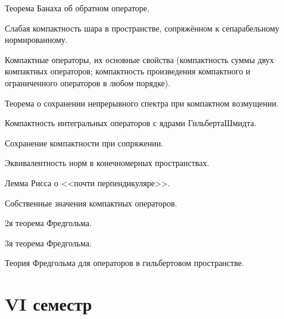 \documentclass[a4paper]{article}
\begin{document}
\begin{nums}{-3}
\item Теорема Банаха об обратном операторе. \cite[III, 5]{ls}
\item Слабая компактность шара в пространстве, сопряжённом к сепарабельному нормированному. \cite[IV, 3]{kf}
\item Компактные операторы, их основные свойства (компактность суммы двух компактных
операторов; компактность произведения компактного и ограниченного операторов
в любом порядке). \cite[IV, 6]{kf}
\item Теорема о сохранении непрерывного спектра при компактном возмущении. \cite{gl}
\item Компактность интегральных операторов с ядрами Гильберта\ч Шмидта. \cite{sh}
\item Сохранение компактности при сопряжении. \cite[IV, 6]{kf}
\item Эквивалентность норм в конечномерных пространствах. \cite[II, 2]{ls}
\item Лемма Рисса о <<почти перпендикуляре>>.
\item Собственные значения компактных операторов. \cite[IV, 6]{kf}
\item 2\д я теорема Фредгольма. \cite{ls}
\item 3\д я теорема Фредгольма.
\item Теория Фредгольма для операторов в гильбертовом пространстве.
\end{nums}

\pagebreak

\section*{VI семестр}
\end{document}
